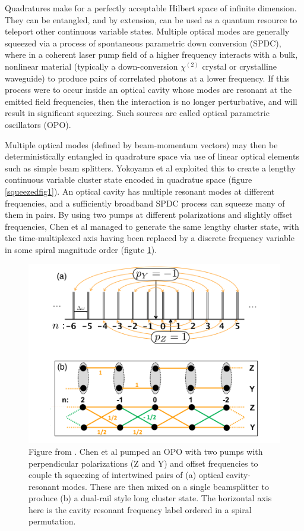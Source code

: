 \documentclass[twocolumn]{Styles/IEEEtran11}
\begin{document}
Quadratures make for a perfectly acceptable Hilbert space of infinite dimension. They can be entangled, and by extension, can be used as a quantum resource to teleport other continuous variable states. Multiple optical modes are generally squeezed via a process of spontaneous parametric down conversion (SPDC), where in a coherent laser pump field of a higher frequency interacts with a bulk, nonlinear material (typically a down-conversion $\chi^{(2)}$ crystal or crystalline waveguide) to produce pairs of correlated photons at a lower frequency. If this process were to occur inside an optical cavity whose modes are resonant at the emitted field frequencies, then the interaction is no longer perturbative, and will result in significant squeezing. Such sources are called optical parametric oscillators (OPO).

Multiple optical modes (defined by beam-momentum vectors) may then be deterministically entangled in quadrature space via use of linear optical elements such as simple beam splitters. Yokoyama et al \cite{furusawa2013} exploited this to create a lengthy continuous variable cluster state encoded in quadratue space (figure \ref{squeezedfig1}). An optical cavity has multiple resonant modes at different frequencies, and a sufficiently broadband SPDC process can squeeze many of them in pairs. By using two pumps at different polarizations and slightly offset frequencies, Chen et al \cite{pfister2014} managed to generate the same lengthy cluster state, with the time-multiplexed axis having been replaced by a discrete frequency variable in some spiral magnitude order (figute \ref{squeezedfig2}).

\begin{figure}[htb]
  \centering
  \includegraphics[width=\linewidth]{Images/squeezed02.png}
  \caption{Figure from \protect\cite{pfister2014}. Chen et al pumped an OPO with two pumps with perpendicular polarizations (Z and Y) and offset frequencies to couple th squeezing of intertwined pairs of (a) optical cavity-resonant modes. These are then mixed on a single beamsplitter to produce (b) a dual-rail style long cluster state. The horizontal axis here is the cavity resonant frequency label ordered in a spiral permutation.}
  \label{squeezedfig2}
\end{figure}
\end{document}
